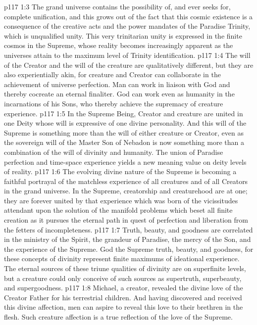 \vs p117 1:3 The grand universe contains the possibility of, and ever seeks for, complete unification, and this grows out of the fact that this cosmic existence is a consequence of the creative acts and the power mandates of the Paradise Trinity, which is unqualified unity. This very trinitarian unity is expressed in the finite cosmos in the Supreme, whose reality becomes increasingly apparent as the universes attain to the maximum level of Trinity identification.\plusone
\pc \vs p117 1:4 The will of the Creator and the will of the creature are qualitatively different, but they are also experientially akin, for creature and Creator can collaborate in the achievement of universe perfection. Man can work in liaison with God and thereby cocreate an eternal finaliter. God can work even as humanity in the incarnations of his Sons, who thereby achieve the supremacy of creature experience.
\vs p117 1:5 In the Supreme Being, Creator and creature are united in one Deity whose will is expressive of one divine personality. And this will of the Supreme is something more than the will of either creature or Creator, even as the sovereign will of the Master Son of Nebadon is now something more than a combination of the will of divinity and humanity. The union of Paradise perfection and time\hyp{}space experience yields a new meaning value on deity levels of reality.
\vs p117 1:6 The evolving divine nature of the Supreme is becoming a faithful portrayal of the matchless experience of all creatures and of all Creators in the grand universe. In the Supreme, creatorship and creaturehood are at one; they are forever united by that experience which was born of the vicissitudes attendant upon the solution of the manifold problems which beset all finite creation as it pursues the eternal path in quest of perfection and liberation from the fetters of incompleteness.
\pc \vs p117 1:7 Truth, beauty, and goodness are correlated in the ministry of the Spirit, the grandeur of Paradise, the mercy of the Son, and the experience of the Supreme. God the Supreme  truth, beauty, and goodness, for these concepts of divinity represent finite maximums of ideational experience. The eternal sources of these triune qualities of divinity are on superfinite levels, but a creature could only conceive of such sources as supertruth, superbeauty, and supergoodness.
\vs p117 1:8 Michael, a creator, revealed the divine love of the Creator Father for his terrestrial children. And having discovered and received this divine affection, men can aspire to reveal this love to their brethren in the flesh. Such creature affection is a true reflection of the love of the Supreme.
